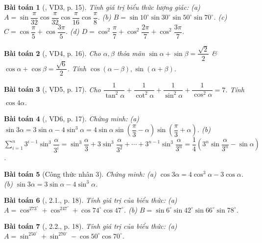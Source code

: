 \documentclass{article}
\newtheorem{baitoan}{Bài toán}
\begin{document}
\begin{baitoan}[\cite{Hung_nang_cao_phat_trien_Toan_11_tap_1}, VD3, p. 15]
	Tính giá trị biểu thức lượng giác: (a) $A = \sin\dfrac{\pi}{32}\cos\dfrac{\pi}{32}\cos\dfrac{\pi}{16}\cos\dfrac{\pi}{8}$. (b) $B = \sin10^\circ\sin30^\circ\sin50^\circ\sin70^\circ$. (c) $C = \cos\dfrac{\pi}{5} + \cos\dfrac{3\pi}{5}$. (d) $D = \cos^2\dfrac{\pi}{7} + \cos^2\dfrac{2\pi}{7} + \cos^2\dfrac{3\pi}{7}$.
\end{baitoan}

\begin{baitoan}[\cite{Hung_nang_cao_phat_trien_Toan_11_tap_1}, VD4, p. 16]
	Cho $\alpha,\beta$ thỏa mãn $\sin\alpha + \sin\beta = \dfrac{\sqrt{2}}{2}$ \& $\cos\alpha + \cos\beta = \dfrac{\sqrt{6}}{2}$. Tính $\cos(\alpha - \beta),\sin(\alpha + \beta)$.
\end{baitoan}

\begin{baitoan}[\cite{Hung_nang_cao_phat_trien_Toan_11_tap_1}, VD5, p. 17]
	Cho $\dfrac{1}{\tan^2\alpha} + \dfrac{1}{\cot^2\alpha} + \dfrac{1}{\sin^2\alpha} + \dfrac{1}{\cos^2\alpha} = 7$. Tính $\cos4\alpha$.
\end{baitoan}

\begin{baitoan}[\cite{Hung_nang_cao_phat_trien_Toan_11_tap_1}, VD6, p. 17]
	Chứng minh: (a) $\sin3\alpha = 3\sin\alpha - 4\sin^3\alpha = 4\sin\alpha\sin\left(\dfrac{\pi}{3} - \alpha\right)\sin\left(\dfrac{\pi}{3} + \alpha\right)$. (b) $\sum_{i=1}^n 3^{i-1}\sin^3\dfrac{\alpha}{3^i} = \sin^3\dfrac{\alpha}{3} + 3\sin^3\dfrac{\alpha}{3^2} + \cdots + 3^{n-1}\sin^3\dfrac{\alpha}{3^n} = \dfrac{1}{4}\left(3^n\sin\dfrac{\alpha}{3^n} - \sin\alpha\right)$.
\end{baitoan}

\begin{baitoan}[Công thức nhân 3]
	Chứng minh: (a) $\cos3\alpha = 4\cos^3\alpha - 3\cos\alpha$. (b) $\sin3\alpha = 3\sin\alpha - 4\sin^3\alpha$.
\end{baitoan}

\begin{baitoan}[\cite{Hung_nang_cao_phat_trien_Toan_11_tap_1}, 2.1., p. 18]
	Tính giá trị của biểu thức: (a) $A = \cos^273^\circ + \cos^247^\circ + \cos74^\circ\cos47^\circ$. (b) $B = \sin6^\circ\sin42^\circ\sin66^\circ\sin78^\circ$.
\end{baitoan}

\begin{baitoan}[\cite{Hung_nang_cao_phat_trien_Toan_11_tap_1}, 2.2., p. 18]
	Tính giá trị của biểu thức: (a) $A = \sin^250^\circ + \sin^270^\circ - \cos50^\circ\cos70^\circ$.
\end{baitoan}
\end{document}
